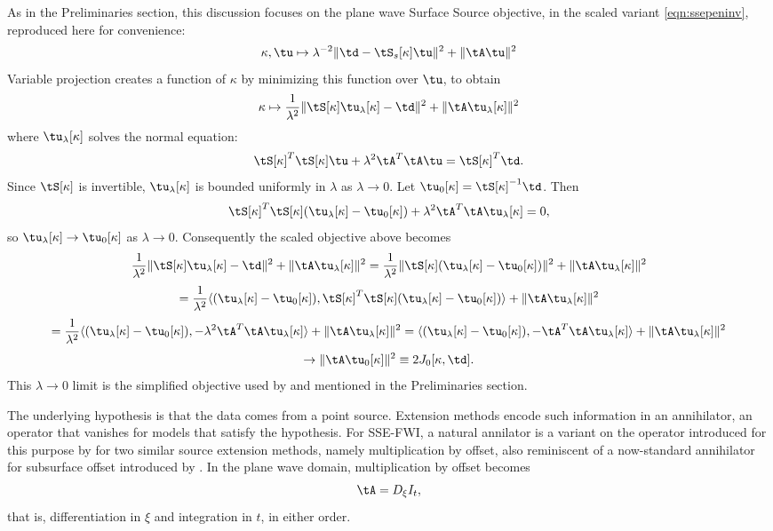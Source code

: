 As in the Preliminaries section, this discussion focuses on the plane wave
Surface Source objective, in the scaled variant \ref{eqn:ssepeninv},
reproduced here for convenience:
\begin{equation}
  \label{eqn:ssepeninv1}
  \kappa,\tu \mapsto \lambda^{-2}\|\td-\tS_s[\kappa]\tu\|^2 + \|\tA\tu\|^2
\end{equation}
Variable projection creates a function of $\kappa$ by minimizing this
function over $\tu$, to obtain
\[
\kappa \mapsto \frac{1}{\lambda^2}\|\tS[\kappa]\tu_{\lambda}[\kappa]-\td\|^2 + \|\tA
\tu_{\lambda}[\kappa]\|^2
\]
where $\tu_{\lambda}[\kappa]$ solves the normal equation:
\[
\tS[\kappa]^T\tS[\kappa]\tu  + \lambda^2\tA^T\tA\tu = \tS[\kappa]^T\td.
\]
Since $\tS[\kappa]$ is invertible, $\tu_{\lambda}[\kappa]$ is
bounded uniformly in $\lambda$ as $\lambda \rightarrow 0$. Let $\tu_0[\kappa] =
\tS[\kappa]^{-1}\td$. Then
\[
\tS[\kappa]^T\tS[\kappa](\tu_{\lambda}[\kappa]-\tu_0[\kappa])+\lambda^2\tA^T\tA\tu_{\lambda}[\kappa]
= 0,
\]
so $\tu_{\lambda}[\kappa] \rightarrow \tu_0[\kappa]$ as $\lambda
\rightarrow 0$. Consequently the scaled objective above becomes
\[
\frac{1}{\lambda^2}\|\tS[\kappa]\tu_{\lambda}[\kappa]-\td\|^2 + \|\tA 
\tu_{\lambda}[\kappa]\|^2
=\frac{1}{\lambda^2}\|\tS[\kappa](\tu_{\lambda}[\kappa]-\tu_0[\kappa])\|^2 + \|\tA 
\tu_{\lambda}[\kappa]\|^2
\]
\[
=\frac{1}{\lambda^2}\langle (\tu_{\lambda}[\kappa]-\tu_0[\kappa]),
\tS[\kappa]^T\tS[\kappa](\tu_{\lambda}[\kappa]-\tu_0[\kappa])\rangle+ \|\tA 
\tu_{\lambda}[\kappa]\|^2
\]
\[
=\frac{1}{\lambda^2}\langle (\tu_{\lambda}[\kappa]-\tu_0[\kappa]),
-\lambda^2\tA^T\tA \tu_{\lambda}[\kappa] \rangle + \|\tA\tu_{\lambda}[\kappa]\|^2
=\langle (\tu_{\lambda}[\kappa]-\tu_0[\kappa]),
-\tA^T\tA \tu_{\lambda}[\kappa] \rangle + \|\tA\tu_{\lambda}[\kappa]\|^2
\]
\begin{equation}
\label{eqn:j0def}
\rightarrow \|\tA\tu_0[\kappa]\|^2 \equiv 2 J_0[\kappa,\td].
\end{equation}
This $\lambda \rightarrow 0$ limit is the simplified objective used by
\cite{Symes:EAGE15} and mentioned in the Preliminaries section.


The underlying hypothesis is that the data comes from a point
source. Extension methods encode such information in an annihilator,
an operator that vanishes for models that satisfy the hypothesis. For
SSE-FWI, a natural annilator is a variant on the operator introduced
for this purpose by \cite{HuangSymes:Geo18a,HuangSymes:Geo18b} for two
similar source extension methods, namely multiplication by offset,
also reminiscent of a now-standard annihilator for subsurface offset
introduced by \cite{stolk2001c}. In the plane wave domain,
multiplication by offset becomes 
\[
\tA = D_{\xi}I_t,
\]
that is, differentiation in $\xi$ and integration in $t$, in either
order.

